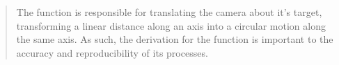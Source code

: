 \begin{quote}
    \begin{center}
    
         The function  is responsible for translating the camera about it's target, transforming a linear distance along an axis into a circular motion along the same axis. As such, the derivation for the function is important to the accuracy and reproducibility of its processes.

    \end{center}
\end{quote}

